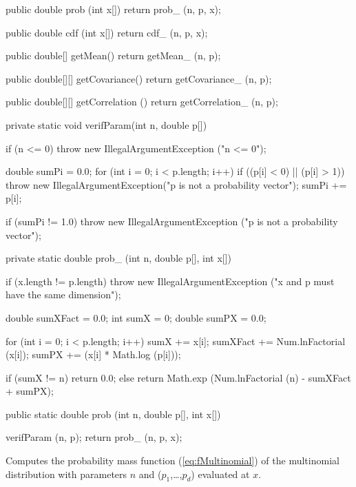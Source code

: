 \begin{code}\begin{hide}
   public double prob (int x[]) {
      return prob_ (n, p, x);
   }

   public double cdf (int x[]) {
      return cdf_ (n, p, x);
   }

   public double[] getMean() {
      return getMean_ (n, p);
   }

   public double[][] getCovariance() {
      return getCovariance_ (n, p);
   }

   public double[][] getCorrelation () {
      return getCorrelation_ (n, p);
   }

   private static void verifParam(int n, double p[]) {
      if (n <= 0)
         throw new IllegalArgumentException ("n <= 0");

      double sumPi = 0.0;
      for (int i = 0; i < p.length; i++) {
         if ((p[i] < 0) || (p[i] > 1))
            throw new IllegalArgumentException("p is not a probability vector");
         sumPi += p[i];
      }

      if (sumPi != 1.0)
         throw new IllegalArgumentException ("p is not a probability vector");
   }

   private static double prob_ (int n, double p[], int x[]) {
      if (x.length != p.length)
         throw new IllegalArgumentException ("x and p must have the same dimension");

      double sumXFact = 0.0;
      int sumX = 0;
      double sumPX = 0.0;

      for (int i = 0; i < p.length; i++) {
         sumX += x[i];
         sumXFact += Num.lnFactorial (x[i]);
         sumPX += (x[i] * Math.log (p[i]));
      }

      if (sumX != n)
         return 0.0;
      else {
         return Math.exp (Num.lnFactorial (n) - sumXFact + sumPX);
      }
   }
\end{hide}

   public static double prob (int n, double p[], int x[])\begin{hide} {
      verifParam (n, p);
      return prob_ (n, p, x);
   }\end{hide}
\end{code}
\begin{tabb}
   Computes the probability mass function (\ref{eq:fMultinomial})
   of the multinomial distribution with parameters $n$ and
   ($p_1$,\ldots,$p_d$) evaluated at $x$.
\end{tabb}
